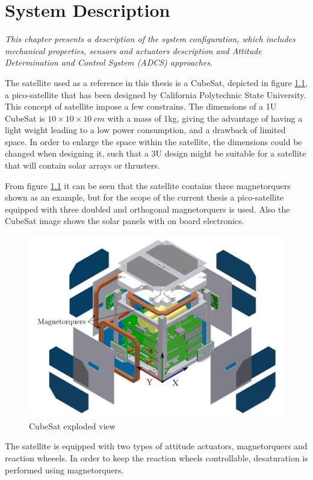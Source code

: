 \chapter{System Description}\label{chap:systemDescribtion}
\textit{This chapter presents a description of the system configuration, which includes mechanical properties, sensors and actuators description and Attitude Determination and Control System (ADCS) approaches.}

The satellite used as a reference in this thesis is a CubeSat, depicted in figure \ref{fig:cube}, a pico-satellite that has been designed by California Polytechnic State University. This concept of satellite impose a few constrains. The dimensions of a 1U CubeSat  is $10 \times 10 \times 10 \ cm$ with a mass of 1kg, giving the advantage of having a light weight leading to a low power consumption, and a drawback of limited space. In order to enlarge the space within the satellite, the dimensions could be changed when designing it, such that a 3U design might be suitable for a satellite that will contain solar arrays or thrusters.

 From figure \ref{fig:cube} it can be seen that the satellite contains three magnetorquers shown as an example, but for the scope of the current thesis a pico-satellite equipped with three doubled and orthogonal magnetorquers is used. Also the CubeSat image shows the solar panels with on board electronics.

\begin{figure}[H]
	\centering
	\includegraphics[width=0.7\linewidth]{figures/cubesat}
	\caption{CubeSat exploded view \cite{report}}
	\label{fig:cube}
\end{figure}

The satellite is equipped with two types of attitude actuators, magnetorquers and reaction wheeels. In order to keep the reaction wheels controllable, desaturation is performed using magnetorquers.

